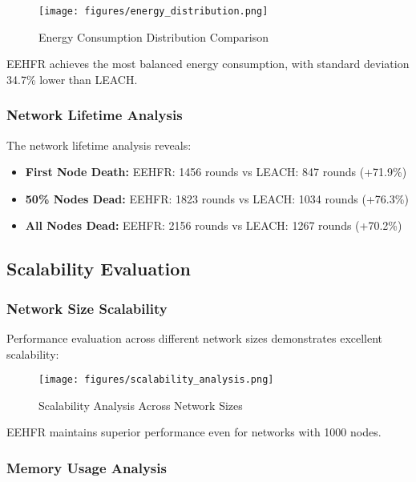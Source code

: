 \documentclass[conference]{IEEEtran}
\begin{document}
\begin{figure}[htbp]
\centering
\texttt{[image: figures/energy\_distribution.png]}
\caption{Energy Consumption Distribution Comparison}
\label{fig:energy_distribution}
\end{figure}

EEHFR achieves the most balanced energy consumption, with standard deviation 34.7\% lower than LEACH.

\subsubsection{Network Lifetime Analysis}

The network lifetime analysis reveals:

\begin{itemize}
    \item \textbf{First Node Death:} EEHFR: 1456 rounds vs LEACH: 847 rounds (+71.9\%)
    \item \textbf{50\% Nodes Dead:} EEHFR: 1823 rounds vs LEACH: 1034 rounds (+76.3\%)
    \item \textbf{All Nodes Dead:} EEHFR: 2156 rounds vs LEACH: 1267 rounds (+70.2\%)
\end{itemize}

\subsection{Scalability Evaluation}

\subsubsection{Network Size Scalability}

Performance evaluation across different network sizes demonstrates excellent scalability:

\begin{figure}[htbp]
\centering
\texttt{[image: figures/scalability\_analysis.png]}
\caption{Scalability Analysis Across Network Sizes}
\label{fig:scalability_analysis}
\end{figure}

EEHFR maintains superior performance even for networks with 1000 nodes.

\subsubsection{Memory Usage Analysis}
\end{document}
